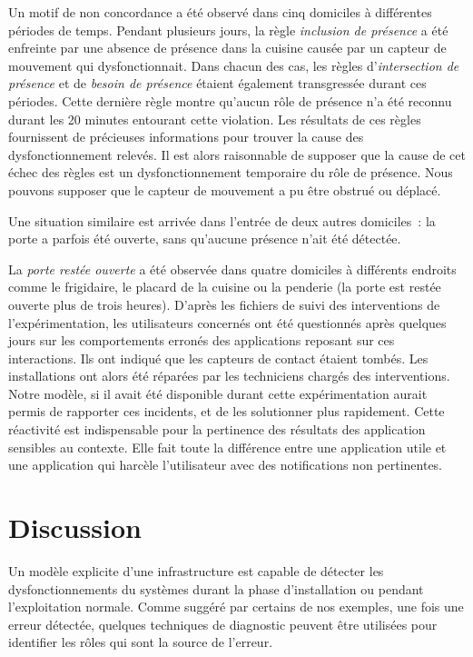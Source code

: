 Un motif de non concordance a été observé dans cinq domiciles à différentes 
périodes de temps. Pendant plusieurs jours, la règle {\em inclusion de présence} 
a été enfreinte par une absence de présence dans la cuisine causée par un 
capteur de mouvement qui dysfonctionnait. Dans chacun des cas, les règles 
d'{\em intersection de présence} et de {\em besoin de présence} étaient 
également transgressée durant ces périodes. Cette dernière règle montre 
qu'aucun rôle de présence n'a été reconnu durant les 20 minutes entourant cette 
violation. Les résultats de ces règles fournissent de précieuses informations 
pour trouver la cause des dysfonctionnement relevés. Il est alors raisonnable de 
supposer que la cause de cet échec des règles est un dysfonctionnement temporaire 
du rôle de présence. Nous pouvons supposer que le capteur de mouvement a pu être obstrué 
ou déplacé. 

Une situation similaire est arrivée dans l'entrée de deux autres domiciles~: la 
porte a parfois été ouverte, sans qu'aucune présence n'ait été détectée.

La {\em porte restée ouverte} a été observée dans quatre domiciles à différents 
endroits comme le frigidaire, le placard de la cuisine ou la penderie (\ie la 
porte est restée ouverte plus de trois heures). D'après les fichiers de suivi 
des interventions de l'expérimentation, les utilisateurs concernés ont été 
questionnés après quelques jours sur les comportements erronés des applications 
reposant sur ces interactions. Ils ont indiqué que les capteurs de contact 
étaient tombés. Les installations ont alors été réparées par les techniciens 
chargés des interventions. Notre modèle, si il avait été disponible durant 
cette expérimentation aurait permis de rapporter ces incidents, et de les 
solutionner plus rapidement. Cette réactivité est indispensable pour la pertinence 
des résultats des application sensibles au contexte. Elle fait toute la différence 
entre une application utile et une application qui harcèle l'utilisateur avec 
des notifications non pertinentes.

\section{Discussion}\label{sec:discussion}
Un modèle explicite d'une infrastructure est capable de détecter les 
dysfonctionnements du systèmes durant la phase d'installation ou pendant 
l'exploitation normale. Comme suggéré par certains de nos exemples, une fois 
une erreur détectée, quelques techniques de diagnostic peuvent être utilisées 
pour identifier les rôles qui sont la source de l'erreur.  

